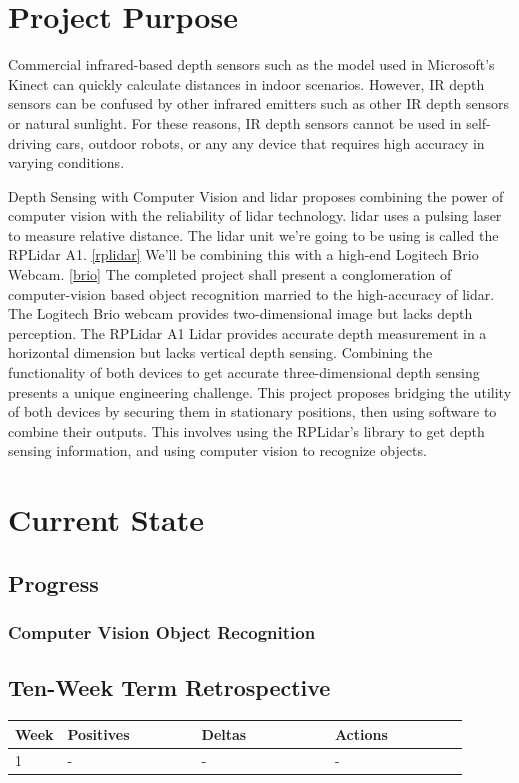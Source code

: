 \documentclass[onecolumn, draftclsnofoot,10pt, compsoc]{IEEEtran}
\begin{document}
\begin{singlespace}
		
		
	\section{Project Purpose}
		Commercial infrared-based depth sensors such as the model used in Microsoft's Kinect can quickly calculate distances in indoor scenarios.
		However, IR depth sensors can be confused by other infrared emitters such as other IR depth sensors or natural sunlight.
		For these reasons, IR depth sensors cannot be used in self-driving cars, outdoor robots, or any any device that requires high accuracy in varying conditions.


		Depth Sensing with Computer Vision and lidar proposes combining the power of computer vision with the reliability of lidar technology.
		lidar uses a pulsing laser to measure relative distance.
		The lidar unit we're going to be using is called the RPLidar A1. \ref{rplidar}
		We'll be combining this with a high-end Logitech Brio Webcam. \ref{brio}
		The completed project shall present a conglomeration of computer-vision based object recognition married to the high-accuracy of lidar.
		The Logitech Brio webcam provides two-dimensional image but lacks depth perception.
		The RPLidar A1 Lidar provides accurate depth measurement in a horizontal dimension but lacks vertical depth sensing.
		Combining the functionality of both devices to get accurate three-dimensional depth sensing presents a unique engineering challenge.
		This project proposes bridging the utility of both devices by securing them in stationary positions, then using software to combine their outputs.
		This involves using the RPLidar's library to get depth sensing information, and using computer vision to recognize objects.

	\section{Current State}

	\subsection{Progress}


		\subsubsection{Computer Vision Object Recognition}


	\subsection{Ten-Week Term Retrospective}
		\begin{longtable}{|l|p{0.3\linewidth}|p{0.3\linewidth}|p{0.3\linewidth}|}\hline \textbf{Week} & \textbf{Positives} & \textbf{Deltas} & \textbf{Actions}\\\hline
		1 	& - & - & -\\\hline


\end{longtable}
\end{singlespace}
\end{document}
